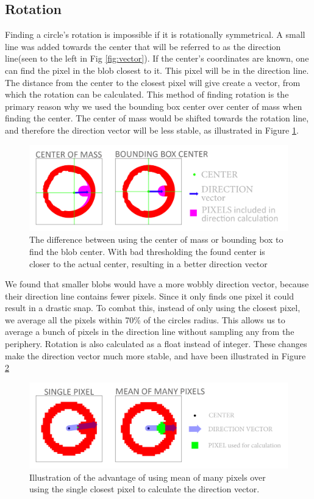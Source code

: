 \subsection{Rotation}
Finding a circle's rotation is impossible if it is rotationally symmetrical. A small line was added towards the center that will be referred to as the direction line(seen to the left in Fig \ref{fig:vector}). If the center's coordinates are known, one can find the pixel in the blob closest to it. This pixel will be in the direction line. The distance from the center to the closest pixel will give create a vector, from which the rotation can be calculated. This method of finding rotation is the primary reason why we used the bounding box center over center of mass when finding the center. The center of mass would be shifted towards the rotation line, and therefore the direction vector will be less stable, as illustrated in Figure \ref{fig:boundbox}.\\
\begin{figure}[H]
	\centering
	\includegraphics[width=1\linewidth]{figure/Analysis/boundingbox.png}
	\caption{The difference between using the center of mass or bounding box to find the blob center. With bad thresholding the found center is closer to the actual center, resulting in a better direction vector} 
	\label{fig:boundbox}
\end{figure}
We found that smaller blobs would have a more wobbly direction vector, because their direction line contains fewer pixels. Since it only finds one pixel it could result in a drastic snap. To combat this, instead of only using the closest pixel, we average all the pixels within 70\% of the circles radius. This allows us to average a bunch of pixels in the direction line without sampling any from the
periphery. Rotation is also calculated as a float instead of integer. These changes make the direction vector much more stable, and have been illustrated in Figure \ref{fig:lowpixel}
\begin{figure}[H]
	\centering
	\includegraphics[width=1\linewidth]{figure/Analysis/lowpixel.png}
	\caption{Illustration of the advantage of using mean of many pixels over using the single closest pixel to calculate the direction vector.} 
	\label{fig:lowpixel}
\end{figure}
